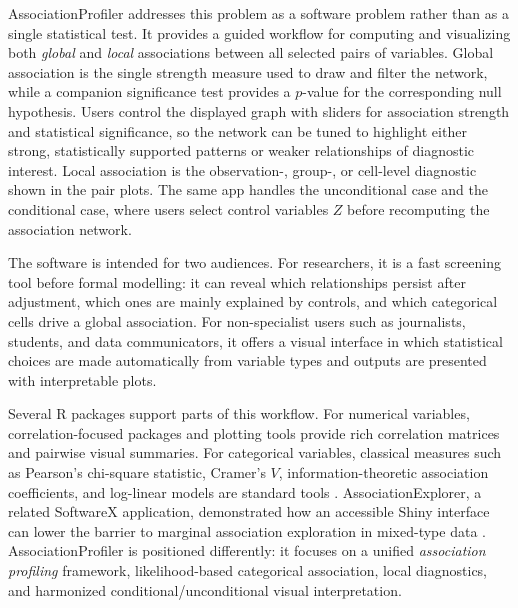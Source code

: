 \documentclass[preprint,12pt,a4paper]{elsarticle}
\numberwithin{equation}{section}
\begin{document}
AssociationProfiler addresses this problem as a software problem rather than as a single statistical test. It provides a guided workflow for computing and visualizing both \emph{global} and \emph{local} associations between all selected pairs of variables. Global association is the single strength measure used to draw and filter the network, while a companion significance test provides a $p$-value for the corresponding null hypothesis. Users control the displayed graph with sliders for association strength and statistical significance, so the network can be tuned to highlight either strong, statistically supported patterns or weaker relationships of diagnostic interest. Local association is the observation-, group-, or cell-level diagnostic shown in the pair plots. The same app handles the unconditional case and the conditional case, where users select control variables $Z$ before recomputing the association network.

The software is intended for two audiences. For researchers, it is a fast screening tool before formal modelling: it can reveal which relationships persist after adjustment, which ones are mainly explained by controls, and which categorical cells drive a global association. For non-specialist users such as journalists, students, and data communicators, it offers a visual interface in which statistical choices are made automatically from variable types and outputs are presented with interpretable plots.

Several R packages support parts of this workflow. For numerical variables, correlation-focused packages and plotting tools provide rich correlation matrices and pairwise visual summaries. For categorical variables, classical measures such as Pearson's chi-square statistic, Cramer's $V$, information-theoretic association coefficients, and log-linear models are standard tools \cite{pearson1900,cramer1946,linfoot1957,hamdan1971,agresti2013}. AssociationExplorer, a related SoftwareX application, demonstrated how an accessible Shiny interface can lower the barrier to marginal association exploration in mixed-type data \cite{soetewey2026}. AssociationProfiler is positioned differently: it focuses on a unified \emph{association profiling} framework, likelihood-based categorical association, local diagnostics, and harmonized conditional/unconditional visual interpretation.
\end{document}
